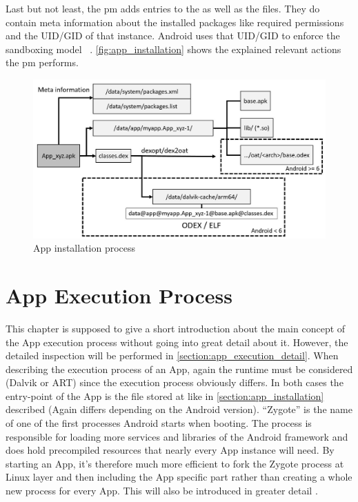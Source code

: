 Last but not least, the pm adds entries to the
 as well as the
 files. They do contain
meta information about the installed packages like
required permissions and the UID/GID of that instance.
Android uses that UID/GID to enforce the sandboxing model
~\parencite[ch.1]{securityinternals}.
\autoref{fig:app_installation} shows the explained
relevant actions the pm performs.

\begin{figure}[htb]
  \includegraphics[width=\textwidth]{figures/app_installation}
  \caption[App installation process]{App installation process}
  \label{fig:app_installation}
\end{figure}

\section{App Execution Process}\label{section:app_execution_simple}
This chapter is supposed to give a short introduction about the
main concept of the App execution process without going into
great detail about it. However, the detailed inspection will
be performed in \autoref{section:app_execution_detail}.
When describing the execution process of an App, again the
runtime must be considered (Dalvik or ART) since the execution process
obviously differs. In both cases the entry-point of the App is the
file stored at  like in
\autoref{section:app_installation} described (Again differs depending on the Android version).
``Zygote'' is
the name of one of the first processes Android starts when booting.
The process is responsible for loading more services and libraries
of the Android framework and does hold precompiled resources that
nearly every App instance will need.
By starting an App, it's therefore much more efficient to fork
the Zygote process at Linux layer and then including the App specific part
rather than  creating a whole new process for every App.
This will also be introduced in greater detail \parencite[ch.2]{hackershandbook}.


